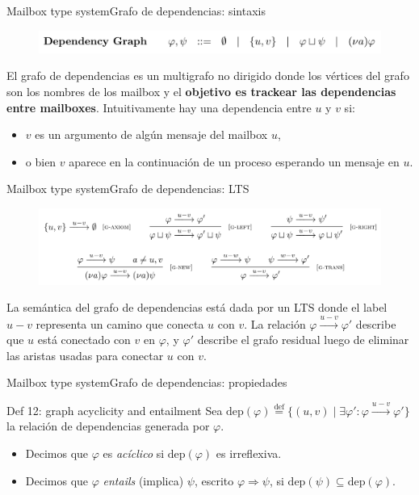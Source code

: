 \documentclass{beamer}
\begin{document}
\begin{frame}{Mailbox type system}{Grafo de dependencias: sintaxis}
    \begin{figure}[H]
        \includegraphics[width=\textwidth]{dependency-graph-syntax}
    \end{figure}

    El grafo de dependencias es un multigrafo no dirigido donde los vértices del grafo son los nombres de los mailbox y el \textbf{objetivo es trackear las dependencias entre mailboxes}. Intuitivamente hay una dependencia entre $u$ y $v$ si:
    \vspace{1em}

    \begin{itemize}
        \item $v$ es un argumento de algún mensaje del mailbox $u$,
        \item o bien $v$ aparece en la continuación de un proceso esperando un mensaje en $u$.
    \end{itemize}
\end{frame}

\begin{frame}{Mailbox type system}{Grafo de dependencias: LTS}
    \begin{figure}[H]
        \includegraphics[width=\textwidth]{dependency-graph-lts}
    \end{figure}

    La semántica del grafo de dependencias está dada por un LTS donde el label $u - v$ representa un camino que conecta $u$ con $v$. La relación $\varphi \xrightarrow{u-v} \varphi'$ describe que $u$ está conectado con $v$ en $\varphi$, y $\varphi'$ describe el grafo residual luego de eliminar las aristas usadas para conectar $u$ con $v$.
\end{frame}

\begin{frame}{Mailbox type system}{Grafo de dependencias: propiedades}
    \begin{block}{Def 12: graph acyclicity and entailment}
        Sea $\text{dep}(\varphi) \stackrel{\text{def}}{=} \{ (u,v) \mid \exists \varphi' : \varphi \xrightarrow{u-v} \varphi' \}$ la relación de dependencias generada por $\varphi$.
        \begin{itemize}
            \item Decimos que $\varphi$ es \emph{acíclico} si $\text{dep}(\varphi)$ es irreflexiva.
            \item Decimos que $\varphi$ \emph{entails} (implica) $\psi$, escrito $\varphi \Rightarrow \psi$, si $\text{dep}(\psi) \subseteq \text{dep}(\varphi)$.
        \end{itemize}
    \end{block}
\end{frame}
\end{document}
